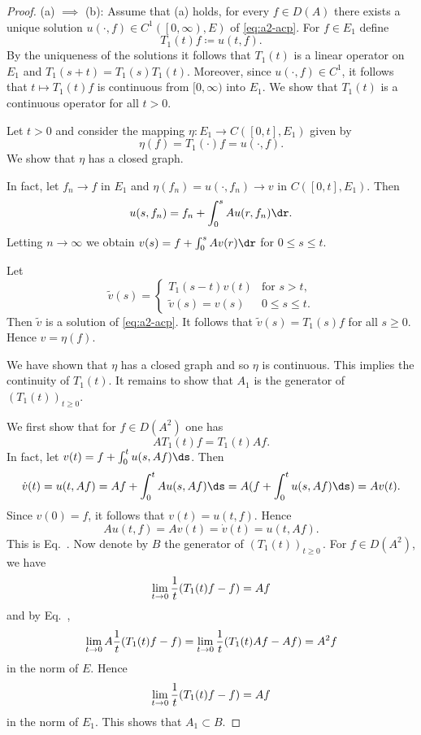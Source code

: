 \begin{proof} (a) $\implies$ (b):   
Assume that (a) holds, \ie for every $f \in D(A)$ there exists a unique solution $u(\cdot,f) \in C^{1}(\left[0,\infty\right),E)$ of \eqref{eq:a2-acp}.
For $f \in E_{1}$ define 
\[
T_{1}(t)f \coloneqq u(t,f) .
\]
By the uniqueness of the solutions it follows that $T_{1}(t)$ is a linear operator on $E_{1}$ and $T_{1}(s+t) = T_{1}(s)T_{1}(t)$.
Moreover, since $u(\cdot,f) \in C^{1}$, it follows that $t \mapsto T_{1}(t)f$ is continuous from $[0,\infty)$ into $E_{1}$.
We show that $T_{1}(t)$ is a continuous operator for all $t > 0$.

Let $t > 0$ and consider the mapping $\eta \colon E_{1} \to C([0,t],E_{1})$ given by 
\[
    \eta(f) = T_{1}(\cdot)f = u(\cdot,f) .
\]
We show that $\eta$ has a closed graph.

In fact, let $f_{n} \to f$ in $E_{1}$ and $\eta(f_{n}) = u(\cdot,f_{n}) \to v$ in $C([0,t],E_{1})$.
Then 
\[
u(s,f_{n}) = f_{n} + \int_{0}^{s} Au(r,f_{n}) \dr .
\]
Letting $n \to \infty$ we obtain $v(s) = f + \int_{0}^{s} Av(r) \dr$ for $0 \leq s \leq t$.

Let 
\[
\tilde{v}(s) = 
\begin{cases}
    T_{1}(s-t)v(t)      & \text{for $s > t$,}\\
    \tilde{v}(s) = v(s) & \text{$0 \leq s \leq t$.}
\end{cases}
\]
Then $\tilde{v}$ is a solution of \eqref{eq:a2-acp}.
It follows that $\tilde{v}(s) = T_{1}(s)f$ for all $s \geq 0$.
Hence $v = \eta(f)$.

We have shown that $\eta$ has a closed graph and so $\eta$ is continuous.
This implies the continuity of\/ $T_{1}(t)$.
It remains to show that $A_{1}$ is the generator of\/ $(T_{1}(t))_{t \geq 0}$.

We first show that for $f \in D(A^{2})$ one has
\begin{equation}\label{eq:a2-1.1}
AT_{1}(t)f = T_{1}(t)Af.
\end{equation}
In fact, let $v(t) = f + \int_{0}^{t} u(s,Af) \ds$.
Then 
\[
\dot{v}(t) = u(t,Af) = Af + \int_{0}^{t} Au(s,Af) \ds = A(f + \int_{0}^{t} u(s,Af) \ds) = Av(t). 
\]
Since $v(0) = f$, it follows that $v(t) = u(t,f)$.
Hence 
%
\[
	Au(t,f) = Av(t) = \dot{v}(t) = u(t,Af) .
\]
%
This is Eq.~.
Now denote by $B$ the generator of\/ $(T_{1}(t))_{t \geq 0}$\,.
For $f \in D(A^{2})$, we have
\[
    \lim_{t \to 0} \frac{1}{t}\mleft( T_{1}(t)f - f \mright) = Af
\]
and by Eq.~,
\[
    \lim_{t \to 0} A\frac{1}{t} \mleft( T_{1}(t)f - f \mright) = 
    \lim_{t \to 0} \frac{1}{t} \mleft( T_{1}(t)Af - Af \mright)
    = A^{2}f
\]
in the norm of\/ $E$.
Hence 
\[ 
\lim_{t \to 0} \frac{1}{t} \mleft( T_{1}(t)f - f \mright) = Af
\]
in the norm of\/ $E_{1}$.
This shows that $A_{1} \subset B$.


\end{proof}
